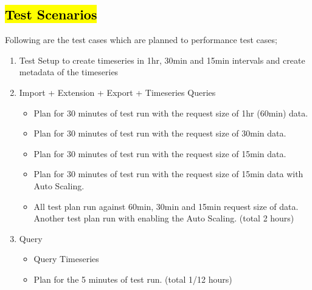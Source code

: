 \subsection{\hl{Test Scenarios}}
\label{subse:test_plan_flow}
Following are the test cases which are planned to performance test cases;
\begin{enumerate}
    \item Test Setup to create timeseries in 1hr, 30min and 15min intervals and create metadata of the timeseries
    \item Import + Extension + Export + Timeseries Queries
    \begin{itemize}
        \item Plan for 30 minutes of test run with the request size of 1hr (60min) data.
        \item Plan for 30 minutes of test run with the request size of 30min data.
        \item Plan for 30 minutes of test run with the request size of 15min data.
        \item Plan for 30 minutes of test run with the request size of 15min data with Auto Scaling.
        \item All test plan run against 60min, 30min and 15min request size of data. Another test plan run with enabling the Auto Scaling. (total 2 hours)
    \end{itemize}
    \item Query
    \begin{itemize}
        \item Query Timeseries
        \item Plan for the 5 minutes of test run. (total 1/12 hours)
    \end{itemize}
\end{enumerate}


